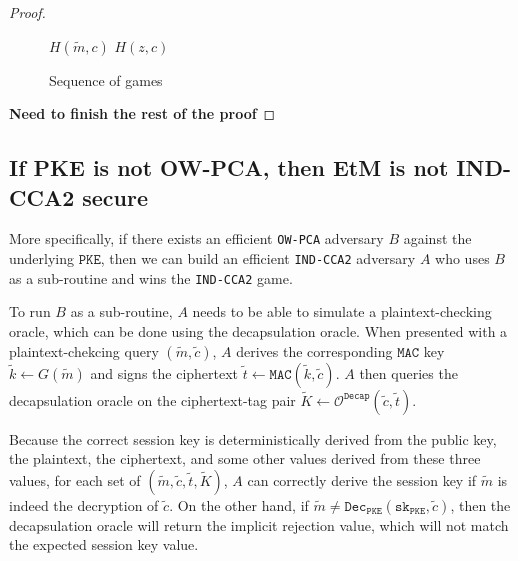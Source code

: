 \documentclass[floatrow,journal=tches,submission]{iacrtrans}
\newcommand{\monospace}{\texttt}
\newcommand{\pke}{\monospace{PKE}}
\newcommand{\decrypt}{\monospace{Dec}}
\newcommand{\decap}{\monospace{Decap}}
\newcommand{\mac}{\monospace{MAC}}
\newcommand{\sk}{\monospace{sk}}
\begin{document}
\begin{proof}
\begin{figure}[H]
\begin{minipage}{0.4\textwidth}
            \begin{algorithm}[H]
                \caption{$\mathcal{O}^\decap_1(c, t)$}\label{alg:etm-decap-oracle-1}
                \begin{algorithmic}[1]
                    \If{$\exists (\tilde{m}, \tilde{k}) \in \mathcal{L}^G :$ \\
                        $\;\;\;\;\decrypt(\sk_\pke, c) = \tilde{m}$ \\
                        $\;\;\;\;\;\land\; \mac(\tilde{k}, c) = t$}
                        \State \Return $H(\tilde{m}, c)$
                    \EndIf
                    \State \Return $H(z, c)$
                \end{algorithmic}
            \end{algorithm}
        \end{minipage}
        \caption{Sequence of games}\label{fig:sequence-of-games}
    \end{figure}

    \textbf{Need to finish the rest of the proof}
\end{proof}

\subsection{If PKE is not OW-PCA, then EtM is not IND-CCA2 secure}\label{sec:not-owpca-implies-not-indcca2}
More specifically, if there exists an efficient \monospace{OW-PCA} adversary $B$ against the underlying $\pke$, then we can build an efficient \monospace{IND-CCA2} adversary $A$ who uses $B$ as a sub-routine and wins the \monospace{IND-CCA2} game.

To run $B$ as a sub-routine, $A$ needs to be able to simulate a plaintext-checking oracle, which can be done using the decapsulation oracle. When presented with a plaintext-chekcing query $(\tilde{m}, \tilde{c})$, $A$ derives the corresponding $\mac$ key $\tilde{k} \leftarrow G(\tilde{m})$ and signs the ciphertext $\tilde{t} \leftarrow \mac(\tilde{k}, \tilde{c})$. $A$ then queries the decapsulation oracle on the ciphertext-tag pair $\tilde{K} \leftarrow \mathcal{O}^\decap(\tilde{c}, \tilde{t})$.

Because the correct session key is deterministically derived from the public key, the plaintext, the ciphertext, and some other values derived from these three values, for each set of $(\tilde{m}, \tilde{c}, \tilde{t}, \tilde{K})$, $A$ can correctly derive the session key if $\tilde{m}$ is indeed the decryption of $\tilde{c}$. On the other hand, if $\tilde{m} \neq \decrypt_\pke(\sk_\pke, \tilde{c})$, then the decapsulation oracle will return the implicit rejection value, which will not match the expected session key value.
\end{document}
